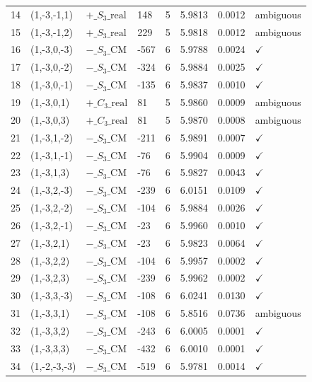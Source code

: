 \begin{table}[ht]
\begin{tabular}{rlllrlll}
14 & (1,-3,-1,1) & $+\_S_3\_\mathrm{real}$ & 148 & 5 & 5.9813 & 0.0012 & ambiguous \\
15 & (1,-3,-1,2) & $+\_S_3\_\mathrm{real}$ & 229 & 5 & 5.9818 & 0.0012 & ambiguous \\
16 & (1,-3,0,-3) & $-\_S_3\_\mathrm{CM}$ & -567 & 6 & 5.9788 & 0.0024 & $\checkmark$ \\
17 & (1,-3,0,-2) & $-\_S_3\_\mathrm{CM}$ & -324 & 6 & 5.9884 & 0.0025 & $\checkmark$ \\
18 & (1,-3,0,-1) & $-\_S_3\_\mathrm{CM}$ & -135 & 6 & 5.9837 & 0.0010 & $\checkmark$ \\
19 & (1,-3,0,1) & $+\_C_3\_\mathrm{real}$ & 81 & 5 & 5.9860 & 0.0009 & ambiguous \\
20 & (1,-3,0,3) & $+\_C_3\_\mathrm{real}$ & 81 & 5 & 5.9870 & 0.0008 & ambiguous \\
21 & (1,-3,1,-2) & $-\_S_3\_\mathrm{CM}$ & -211 & 6 & 5.9891 & 0.0007 & $\checkmark$ \\
22 & (1,-3,1,-1) & $-\_S_3\_\mathrm{CM}$ & -76 & 6 & 5.9904 & 0.0009 & $\checkmark$ \\
23 & (1,-3,1,3) & $-\_S_3\_\mathrm{CM}$ & -76 & 6 & 5.9827 & 0.0043 & $\checkmark$ \\
24 & (1,-3,2,-3) & $-\_S_3\_\mathrm{CM}$ & -239 & 6 & 6.0151 & 0.0109 & $\checkmark$ \\
25 & (1,-3,2,-2) & $-\_S_3\_\mathrm{CM}$ & -104 & 6 & 5.9884 & 0.0026 & $\checkmark$ \\
26 & (1,-3,2,-1) & $-\_S_3\_\mathrm{CM}$ & -23 & 6 & 5.9960 & 0.0010 & $\checkmark$ \\
27 & (1,-3,2,1) & $-\_S_3\_\mathrm{CM}$ & -23 & 6 & 5.9823 & 0.0064 & $\checkmark$ \\
28 & (1,-3,2,2) & $-\_S_3\_\mathrm{CM}$ & -104 & 6 & 5.9957 & 0.0002 & $\checkmark$ \\
29 & (1,-3,2,3) & $-\_S_3\_\mathrm{CM}$ & -239 & 6 & 5.9962 & 0.0002 & $\checkmark$ \\
30 & (1,-3,3,-3) & $-\_S_3\_\mathrm{CM}$ & -108 & 6 & 6.0241 & 0.0130 & $\checkmark$ \\
31 & (1,-3,3,1) & $-\_S_3\_\mathrm{CM}$ & -108 & 6 & 5.8516 & 0.0736 & ambiguous \\
32 & (1,-3,3,2) & $-\_S_3\_\mathrm{CM}$ & -243 & 6 & 6.0005 & 0.0001 & $\checkmark$ \\
33 & (1,-3,3,3) & $-\_S_3\_\mathrm{CM}$ & -432 & 6 & 6.0010 & 0.0001 & $\checkmark$ \\
34 & (1,-2,-3,-3) & $-\_S_3\_\mathrm{CM}$ & -519 & 6 & 5.9781 & 0.0014 & $\checkmark$ \\

\end{tabular}
\end{table}
